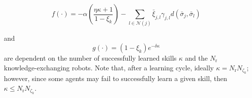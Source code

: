 \documentclass[12pt]{article}
\begin{document}
\begin{equation}\label{eq:f_function_collective}
	f(\cdot) = -\alpha \left( \frac{\eta \kappa + 1}{1 - \xi_k} \right)  - \sum_{l \in \mathcal{N}(j)} \bar{\xi}_{j,l} \gamma_{j,l}d(\bar{\sigma}_j,\bar{\sigma}_l)
\end{equation}

\noindent and 
\begin{equation}%
	g(\cdot) = (1-\xi_k) e^{-\delta \kappa}
\end{equation}
\noindent are dependent on the number of successfully learned skills $ \kappa $ and the $N_\mathrm{r}$ knowledge-exchanging robots. Note that, after a learning cycle, ideally $\kappa= N_\mathrm{r} N_{\zeta_k}$; however, since some agents may fail to successfully learn a given skill, then $\kappa \leq N_\mathrm{r} N_{\zeta_k}$.
\end{document}
